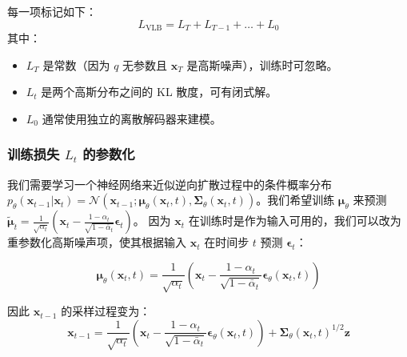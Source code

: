 \documentclass[zihao=-4, fontset=windows]{ctexart}
\begin{document}
每一项标记如下：
\begin{equation}
L_{\text{VLB}} = L_{T} + L_{T-1} + \dots + L_{0}
\end{equation}
其中：
\begin{itemize}
    \item $L_{T}$ 是常数（因为 $q$ 无参数且 $\mathbf{x}_T$ 是高斯噪声），训练时可忽略。
    \item $L_{t}$ 是两个高斯分布之间的 KL 散度，可有闭式解。
    \item $L_{0}$ 通常使用独立的离散解码器来建模。
\end{itemize}

\subsubsection{训练损失 $L_t$ 的参数化}
我们需要学习一个神经网络来近似逆向扩散过程中的条件概率分布 $p_{\theta}(\mathbf{x}_{t-1} | \mathbf{x}_{t})=\mathcal{N}(\mathbf{x}_{t-1} ; \boldsymbol{\mu}_{\theta}(\mathbf{x}_{t}, t), \boldsymbol{\Sigma}_{\theta}(\mathbf{x}_{t}, t))$。我们希望训练 $\boldsymbol{\mu}_{\theta}$ 来预测 $\tilde{\boldsymbol{\mu}}_{t}=\frac{1}{\sqrt{\alpha_{t}}}(\mathbf{x}_{t}-\frac{1-\alpha_{t}}{\sqrt{1-\bar{\alpha}_{t}}} \boldsymbol{\epsilon}_{t})$。
因为 $\mathbf{x}_t$ 在训练时是作为输入可用的，我们可以改为重参数化高斯噪声项，使其根据输入 $\mathbf{x}_t$ 在时间步 $t$ 预测 $\boldsymbol{\epsilon}_t$：

\begin{equation}
\boldsymbol{\mu}_{\theta}(\mathbf{x}_{t}, t)=\frac{1}{\sqrt{\alpha_{t}}}\left(\mathbf{x}_{t}-\frac{1-\alpha_{t}}{\sqrt{1-\bar{\alpha}_{t}}} \boldsymbol{\epsilon}_{\theta}(\mathbf{x}_{t}, t)\right)
\end{equation}

因此 $\mathbf{x}_{t-1}$ 的采样过程变为：
\begin{equation}
\mathbf{x}_{t-1} = \frac{1}{\sqrt{\alpha_{t}}}\left(\mathbf{x}_{t}-\frac{1-\alpha_{t}}{\sqrt{1-\bar{\alpha}_{t}}} \boldsymbol{\epsilon}_{\theta}(\mathbf{x}_{t}, t)\right) + \boldsymbol{\Sigma}_{\theta}(\mathbf{x}_{t}, t)^{1/2}\mathbf{z}
\end{equation}
\end{document}
